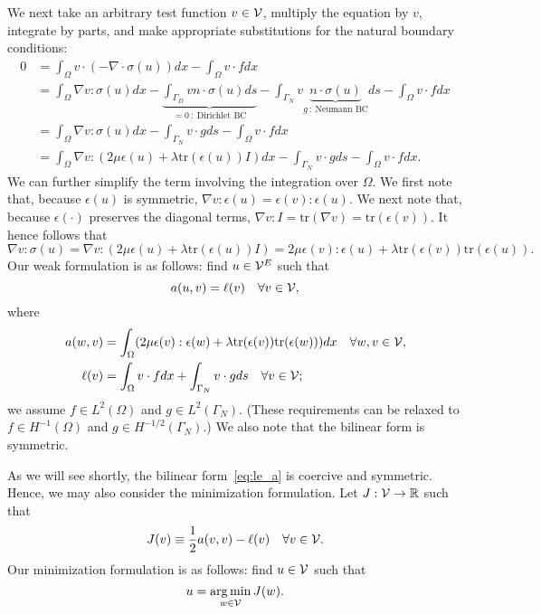 We next take an arbitrary test function $v \in \mathcal{V}$, multiply the equation by $v$, integrate by parts, and make appropriate substitutions for the natural boundary conditions: 
\begin{align*}
  0 &= 
  \int_{\Omega} v \cdot (-\nabla \cdot \sigma(u) ) dx - \int_{\Omega} v \cdot f dx \\
  &=
  \int_{\Omega} \nabla v : \sigma (u) dx - \underbrace{ \int_{\Gamma_D} v n \cdot \sigma(u) ds}_{= 0 \ : \ \text{Dirichlet BC}} - \int_{\Gamma_{N}} v \underbrace{ n \cdot \sigma(u)}_{g \ : \ \text{Neumann BC}} ds - \int_{\Omega} v \cdot f dx \\
  &=
  \int_{\Omega} \nabla v : \sigma (u) dx - \int_{\Gamma_N} v \cdot g ds - \int_{\Omega} v \cdot f dx  \\
  &=
  \int_{\Omega} \nabla v : (2 \mu \epsilon(u) + \lambda \text{tr}(\epsilon(u))I ) dx - \int_{\Gamma_N} v \cdot g ds - \int_{\Omega} v \cdot f dx .
\end{align*}
We can further simplify the term involving the integration over $\Omega$.  We first note that, because $\epsilon(u)$ is symmetric, $\nabla v : \epsilon(u) = \epsilon(v) : \epsilon(u)$. We next note that,  because $\epsilon(\cdot)$ preserves the diagonal terms, $\nabla v: I = \text{tr}(\nabla v) =  \text{tr}(\epsilon(v))$. It hence follows that
\begin{equation*}
  \nabla v : \sigma(u) = \nabla v : (2 \mu \epsilon(u) + \lambda \text{tr}(\epsilon(u)) I )
  = 2 \mu \epsilon(v) : \epsilon(u) + \lambda \text{tr}(\epsilon(v)) \text{tr}(\epsilon(u)) .
\end{equation*}
Our weak formulation is as follows: find $u \in \mathcal{V}^E$ such that
\begin{equation}
  a(u,v) = \ell(v) \quad \forall v \in \mathcal{V},
  \label{eq:le_weak}
\end{equation}
where
\begin{align}
  a(w,v) &= \int_{\Omega} ( 2 \mu \epsilon(v) : \epsilon(w) + \lambda \text{tr}(\epsilon(v)) \text{tr}(\epsilon(w)) ) dx \quad \forall w, v \in \mathcal{V}, \label{eq:le_a} \\
  \ell(v) &=   \int_{\Omega} v \cdot f dx + \int_{\Gamma_N} v \cdot g ds \quad \forall v \in \mathcal{V} \label{eq:le_ell};
\end{align}
we assume $f \in L^2(\Omega)$ and $g \in L^2(\Gamma_N)$.  (These requirements can be relaxed to $f \in H^{-1}(\Omega)$ and $g \in H^{-1/2}(\Gamma_N)$.) We also note that the bilinear form is symmetric.

As we will see shortly, the bilinear form~\eqref{eq:le_a} is coercive and symmetric.  Hence, we may also consider the minimization formulation.  Let $J : \mathcal{V} \to \mathbb{R}$ such that
\begin{equation}
  J(v) \equiv \frac{1}{2} a(v,v) - \ell(v) \quad \forall v \in \mathcal{V}.
  \label{eq:le_J}
\end{equation}
Our minimization formulation is as follows: find $u \in \mathcal{V}$ such that
\begin{equation*}
  u = \operatorname*{arg\,min}_{w \in \mathcal{V}} J(w).
\end{equation*}



